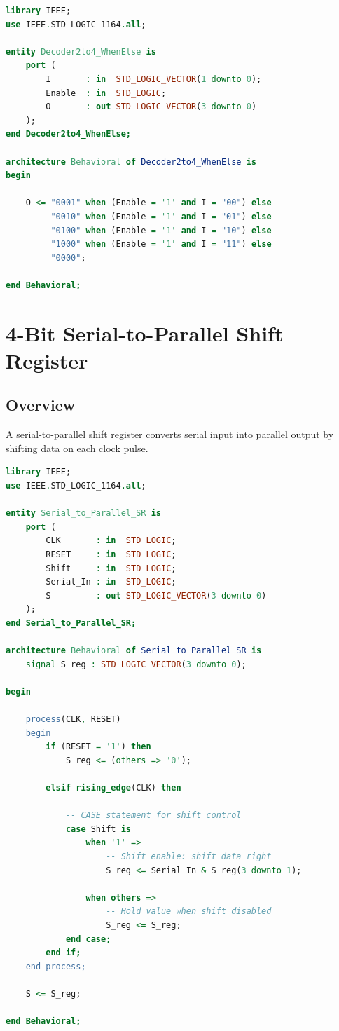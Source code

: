 \documentclass[12pt,a4paper]{article}
\begin{document}
\begin{lstlisting}[language=VHDL]
library IEEE;
use IEEE.STD_LOGIC_1164.all;

entity Decoder2to4_WhenElse is
    port (
        I       : in  STD_LOGIC_VECTOR(1 downto 0);
        Enable  : in  STD_LOGIC;
        O       : out STD_LOGIC_VECTOR(3 downto 0)
    );
end Decoder2to4_WhenElse;

architecture Behavioral of Decoder2to4_WhenElse is
begin
    
    O <= "0001" when (Enable = '1' and I = "00") else
         "0010" when (Enable = '1' and I = "01") else
         "0100" when (Enable = '1' and I = "10") else
         "1000" when (Enable = '1' and I = "11") else
         "0000";
    
end Behavioral;
\end{lstlisting}

\newpage
\section{4-Bit Serial-to-Parallel Shift Register}

\subsection{Overview}

A serial-to-parallel shift register converts serial input into parallel output by shifting data on each clock pulse.

\begin{lstlisting}[language=VHDL]
library IEEE;
use IEEE.STD_LOGIC_1164.all;

entity Serial_to_Parallel_SR is
    port (
        CLK       : in  STD_LOGIC;
        RESET     : in  STD_LOGIC;
        Shift     : in  STD_LOGIC;
        Serial_In : in  STD_LOGIC;
        S         : out STD_LOGIC_VECTOR(3 downto 0)
    );
end Serial_to_Parallel_SR;

architecture Behavioral of Serial_to_Parallel_SR is
    signal S_reg : STD_LOGIC_VECTOR(3 downto 0);
    
begin
    
    process(CLK, RESET)
    begin
        if (RESET = '1') then
            S_reg <= (others => '0');
            
        elsif rising_edge(CLK) then
            
            -- CASE statement for shift control
            case Shift is
                when '1' =>
                    -- Shift enable: shift data right
                    S_reg <= Serial_In & S_reg(3 downto 1);
                
                when others =>
                    -- Hold value when shift disabled
                    S_reg <= S_reg;
            end case;
        end if;
    end process;
    
    S <= S_reg;
    
end Behavioral;
\end{lstlisting}
\end{document}
